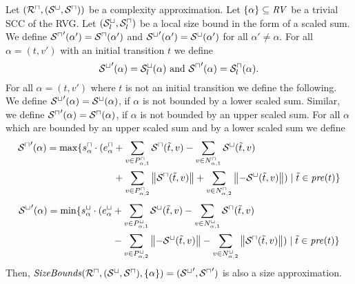 \begin{theorem}
  Let $({\mathcal{R}^\sqcap}, {({\mathcal{S}^\sqcup}, {\mathcal{S}^\sqcap})})$ be a complexity approximation.
  Let $\lbrace \alpha \rbrace \subseteq \mathit{RV}$ be a trivial SCC of the RVG.
  Let ${({\mathcal{S}^\sqcup_l}, {\mathcal{S}^\sqcap_l})}$ be a local size bound in the form of a scaled sum.
  We define ${\mathcal{S}^\sqcap}'(\alpha') = {\mathcal{S}^\sqcap}(\alpha')$ and ${\mathcal{S}^\sqcup}'(\alpha') = {\mathcal{S}^\sqcup}(\alpha')$ for all $\alpha' \neq \alpha$.
  For all $\alpha = (t, v')$ with an initial transition $t$ we define
  \[ {\mathcal{S}^\sqcup}'(\alpha) = {\mathcal{S}^\sqcup_l}(\alpha) \text{ and } {\mathcal{S}^\sqcap}'(\alpha) = {\mathcal{S}^\sqcap_l}(\alpha). \]
  For all $\alpha = (t, v')$ where $t$ is not an initial transition we define the following.
  We define ${\mathcal{S}^\sqcup}'(\alpha) = {\mathcal{S}^\sqcup}(\alpha)$, if $\alpha$ is not bounded by a lower scaled sum.
  Similar, we define ${\mathcal{S}^\sqcap}'(\alpha) = {\mathcal{S}^\sqcap}(\alpha)$, if $\alpha$ is not bounded by an upper scaled sum.
  For all $\alpha$ which are bounded by an upper scaled sum and by a lower scaled sum we define 
  \begin{equation}
    \begin{split}
      {\mathcal{S}^\sqcap}'(\alpha) = \max \lbrace  s^\sqcap_\alpha \cdot ( e^\sqcap_\alpha & + \sum_{v \in P_{\alpha,1}^\sqcap} {\mathcal{S}^\sqcap}(\tilde{t}, v) - \sum_{v \in N_{\alpha,1}^\sqcap} {\mathcal{S}^\sqcup}(\tilde{t}, v) \\
        & + \sum_{v \in P_{\alpha,2}^\sqcap} \left\Vert{\mathcal{S}^\sqcap}(\tilde{t}, v)\right\Vert + \sum_{v \in N_{\alpha,2}^\sqcap} \left\Vert-{\mathcal{S}^\sqcup}(\tilde{t}, v)\right\Vert ) \mid \tilde{t} \in \mathit{pre}(t) \rbrace
    \end{split}
  \end{equation}
  \begin{equation}
    \begin{split}
      {\mathcal{S}^\sqcup}'(\alpha) = \min \lbrace  s^\sqcup_\alpha \cdot ( e^\sqcup_\alpha & + \sum_{v \in P_{\alpha,1}^\sqcup} {\mathcal{S}^\sqcup}(\tilde{t}, v) - \sum_{v \in N_{\alpha,1}^\sqcup} {\mathcal{S}^\sqcap}(\tilde{t}, v) \\
        & - \sum_{v \in P_{\alpha,2}^\sqcup} \left\Vert-{\mathcal{S}^\sqcup}(\tilde{t}, v)\right\Vert - \sum_{v \in N_{\alpha,2}^\sqcup} \left\Vert{\mathcal{S}^\sqcap}(\tilde{t}, v)\right\Vert ) \mid \tilde{t} \in \mathit{pre}(t) \rbrace
    \end{split}
  \end{equation}
  Then, $\mathit{SizeBounds}({\mathcal{R}^\sqcap}, {({\mathcal{S}^\sqcup}, {\mathcal{S}^\sqcap})}, \lbrace \alpha \rbrace) = ({\mathcal{S}^\sqcup}', {\mathcal{S}^\sqcap}')$ is also a size approximation.
\end{theorem}

